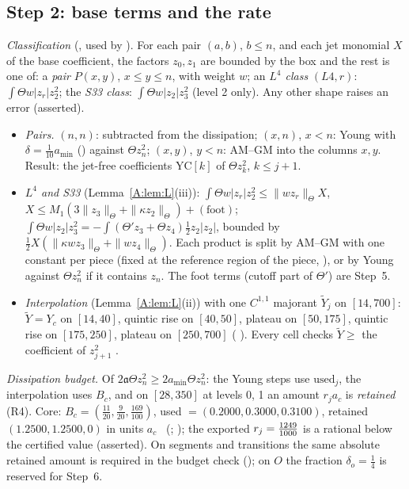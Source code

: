 \documentclass[11pt]{article}
\begin{document}
\subsection{Step 2: base terms and the rate}\label{A:sec:base}
\emph{Classification} (, used by  ). For each pair $(a,b)$, $b\le n$, and each jet monomial $X$ of the base coefficient, the factors $z_0,z_1$ are bounded by the box and the rest is one of: a \emph{pair} $P(x,y)$, $x\le y\le n$, with weight $w$; an \emph{$L^4$ class} $(L4,r)$: $\int\Theta w|z_r|z_2^2$; the \emph{S33 class}: $\int\Theta w|z_2|z_3^2$ (level 2 only). Any other shape raises an error (asserted).
\begin{itemize}[leftmargin=*]
\item \emph{Pairs.} $(n,n)$: subtracted from the dissipation; $(x,n)$, $x<n$: Young with $\delta=\frac1{10}a_{\min}$ () against $\Theta z_n^2$; $(x,y)$, $y<n$: AM--GM into the columns $x,y$. Result: the jet-free coefficients $\mathrm{YC}[k]$ of $\Theta z_k^2$, $k\le j+1$.
\item \emph{$L^4$ and S33} (Lemma~\ref{A:lem:L}(iii)): $\int\Theta w|z_r|z_2^2\le\|wz_r\|_\Theta X$, $X\le M_1(3\|z_3\|_\Theta+\|\kappa z_2\|_\Theta)+(\text{foot})$; $\int\Theta w|z_2|z_3^2=-\int(\Theta'z_3+\Theta z_4)\tfrac12z_2|z_2|$, bounded by $\frac12X(\|\kappa wz_3\|_\Theta+\|wz_4\|_\Theta)$. Each product is split by AM--GM with one constant per piece (fixed at the reference region of the piece, ), or by Young against $\Theta z_n^2$ if it contains $z_n$. The foot terms (cutoff part of $\Theta'$) are Step~5.
\item \emph{Interpolation} (Lemma~\ref{A:lem:L}(ii)) with one $C^{1,1}$ majorant $\tilde Y_j$ on $[14,700]$: $\tilde Y=Y_c$ on $[14,40]$, quintic rise on $[40,50]$, plateau on $[50,175]$, quintic rise on $[175,250]$, plateau on $[250,700]$ ( ). Every cell checks $\tilde Y\ge$ the coefficient of $z_{j+1}^2$ \tC.
\end{itemize}
\emph{Dissipation budget.} Of $2\mathfrak a\Theta z_n^2\ge2a_{\min}\Theta z_n^2$: the Young steps use $\mathrm{used}_j$, the interpolation uses $B_c$, and on $[28,350]$ at levels 0, 1 an amount $r_ja_c$ is \emph{retained} (R4). Core: $B_c=(\frac{11}{20},\frac9{20},\frac{169}{100})$, used $=(0.2000,0.3000,0.3100)$, retained $(1.2500,1.2500,0)$ in units $a_c$ \tC\ (;  ); the exported $r_j=\tfrac{1249}{1000}$ is a rational below the certified value (asserted). On segments and transitions the same absolute retained amount is required in the budget check (); on $O$ the fraction $\delta_o=\frac14$ is reserved for Step~6.
\end{document}
